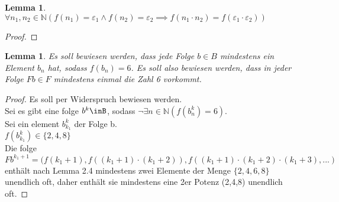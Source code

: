 \documentclass[12pt, letterpaper]{article}
\newtheorem{lemma}[theorem]{Lemma}
\begin{document}
  \begin{lemma}
    \begin{math}
      \forall n_{1},n_{2}\in\mathbb{N}(f(n_{1}) = \varepsilon_{1} \land f(n_{2}) = \varepsilon_{2} \implies f(n_{1}\cdot n_{2})= f(\varepsilon_{1} \cdot \varepsilon_{2}))
    \end{math}
  \end{lemma}
  \begin{proof}
    
  \end{proof}
  \begin{lemma}
    Es soll bewiesen werden, dass jede Folge $b\in B$ mindestens ein Element $b_{n}$ hat, sodass $f(b_{n}) = 6$. Es soll also bewiesen werden, dass in jeder Folge $Fb \in F$ mindestens einmal die Zahl 6 vorkommt. 
  \end{lemma}

  \begin{proof}
    Es soll per Widerspruch bewiesen werden.\\
    Sei es gibt eine folge $b^{k}\inB$, sodass $\neg \exists n\in\mathbb{N}(f(b^{k}_{n}) =6)$.\\
    Sei ein element $b^{k}_{k_{1}}$ der Folge b.\\
    $f(b^{k}_{k_{1}}) \in \{2,4,8\}$\\
    Die folge $Fb^{k_{1}+1}=(f(k_{1}+1),f((k_{1}+1)\cdot (k_{1}+ 2)),f((k_{1}+1)\cdot (k_{1}+ 2)\cdot (k_{1}+3),...)$ enthält nach Lemma 2.4 mindestens zwei Elemente der Menge $\{2,4,6,8\}$ unendlich oft, daher enthält sie mindestens eine 2er Potenz (2,4,8) unendlich oft. 



  \end{proof}
  
\end{document}
